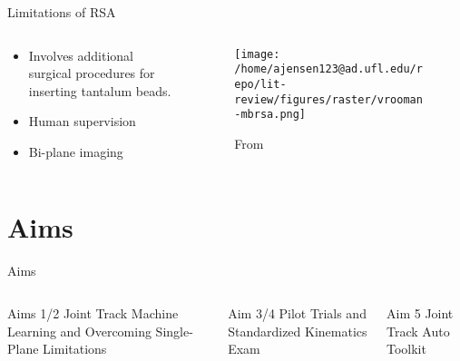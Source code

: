 \documentclass[presentation, aspectratio=1610]{beamer}
\begin{document}
\begin{frame}[label={sec:org99d491e}]{Limitations of RSA}
\begin{columns}
\begin{column}{0.5\columnwidth}
\begin{itemize}
\item Involves additional surgical procedures for inserting tantalum beads.
\item Human supervision
\item Bi-plane imaging
\end{itemize}
\end{column}
\begin{column}{0.6\columnwidth}
\begin{figure}[htbp]
\centering
\texttt{[image: /home/ajensen123@ad.ufl.edu/repo/lit-review/figures/raster/vrooman-mbrsa.png]}
\caption{From \autocite{vroomanFastAccurateAutomated1998}}
\end{figure}
\end{column}
\end{columns}
\end{frame}
\section{Aims}
\label{sec:org35fd664}
\begin{frame}[label={sec:org8d5bbc9}]{Aims}
\begin{columns}
\begin{column}{0.3\columnwidth}
\begin{block}{Aims 1/2}
Joint Track Machine Learning and Overcoming Single-Plane Limitations
\end{block}
\end{column}
\begin{column}{0.3\columnwidth}
\begin{block}{Aim 3/4}
Pilot Trials and Standardized Kinematics Exam
\end{block}
\end{column}
\begin{column}{0.3\columnwidth}
\begin{block}{Aim 5}
Joint Track Auto Toolkit
\end{block}
\end{column}
\end{columns}
\end{frame}
\end{document}
